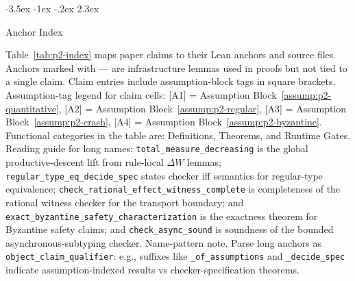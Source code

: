 \documentclass[a4paper,10pt,twocolumn,english]{article}
\makeatletter
\renewcommand{\section}{\@startsection{section}{1}{\z@}%
  {-3.5ex \@plus -1ex \@minus -.2ex}%
  {2.3ex}%
  {\raggedright\normalfont\large\bfseries}}
\numberwithin{equation}{section}
\theoremstyle{paperdef}
\theoremstyle{paperplain}
\theoremstyle{paperdef}
\theoremstyle{paperremark}
\makeatother
\begin{document}
\clearpage
\onecolumn

\section{Anchor Index}
\label{app:index}

Table~\ref{tab:p2-index} maps paper claims to their Lean anchors and source files. Anchors marked with --- are infrastructure lemmas used in proofs but not tied to a single claim. Claim entries include assumption-block tags in square brackets.
Assumption-tag legend for claim cells: [A1] = Assumption
Block~\ref{assump:p2-quantitative}, [A2] = Assumption
Block~\ref{assump:p2-regular}, [A3] = Assumption
Block~\ref{assump:p2-crash}, [A4] = Assumption
Block~\ref{assump:p2-byzantine}.
Functional categories in the table are: Definitions, Theorems, and Runtime
Gates. Reading guide for long names:
\texttt{total\_measure\_decreasing} is the global productive-descent lift from
rule-local $\Delta W$ lemmas; \texttt{regular\_type\_eq\_decide\_spec} states
checker iff semantics for regular-type equivalence;
\texttt{check\_rational\_effect\_witness\_complete} is completeness of the
rational witness checker for the transport boundary; and
\texttt{exact\_byzantine\_safety\_characterization} is the exactness theorem
for Byzantine safety claims; and \texttt{check\_async\_sound} is soundness of
the bounded asynchronous-subtyping checker.
Name-pattern note. Parse long anchors as
\texttt{object\_claim\_qualifier}: e.g., suffixes like
\texttt{\_of\_assumptions} and \texttt{\_decide\_spec} indicate
assumption-indexed results vs checker-specification theorems.
\end{document}
